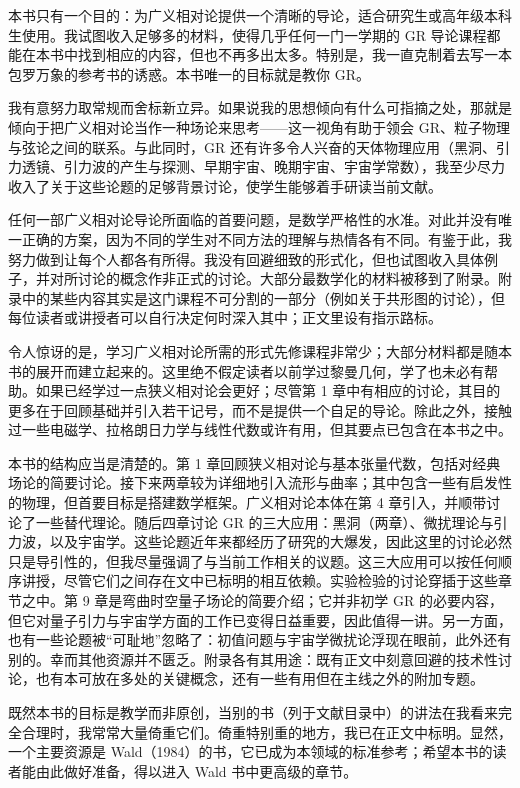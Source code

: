 本书只有一个目的：为广义相对论提供一个清晰的导论，适合研究生或高年级本科生使用。我试图收入足够多的材料，使得几乎任何一门一学期的 GR 导论课程都能在本书中找到相应的内容，但也不再多出太多。特别是，我一直克制着去写一本包罗万象的参考书的诱惑。本书唯一的目标就是教你 GR。

我有意努力取常规而舍标新立异。如果说我的思想倾向有什么可指摘之处，那就是倾向于把广义相对论当作一种场论来思考——这一视角有助于领会 GR、粒子物理与弦论之间的联系。与此同时，GR 还有许多令人兴奋的天体物理应用（黑洞、引力透镜、引力波的产生与探测、早期宇宙、晚期宇宙、宇宙学常数），我至少尽力收入了关于这些论题的足够背景讨论，使学生能够着手研读当前文献。

任何一部广义相对论导论所面临的首要问题，是数学严格性的水准。对此并没有唯一正确的方案，因为不同的学生对不同方法的理解与热情各有不同。有鉴于此，我努力做到让每个人都各有所得。我没有回避细致的形式化，但也试图收入具体例子，并对所讨论的概念作非正式的讨论。大部分最数学化的材料被移到了附录。附录中的某些内容其实是这门课程不可分割的一部分（例如关于共形图的讨论），但每位读者或讲授者可以自行决定何时深入其中；正文里设有指示路标。

令人惊讶的是，学习广义相对论所需的形式先修课程非常少；大部分材料都是随本书的展开而建立起来的。这里绝不假定读者以前学过黎曼几何，学了也未必有帮助。如果已经学过一点狭义相对论会更好；尽管第 1 章中有相应的讨论，其目的更多在于回顾基础并引入若干记号，而不是提供一个自足的导论。除此之外，接触过一些电磁学、拉格朗日力学与线性代数或许有用，但其要点已包含在本书之中。

本书的结构应当是清楚的。第 1 章回顾狭义相对论与基本张量代数，包括对经典场论的简要讨论。接下来两章较为详细地引入流形与曲率；其中包含一些有启发性的物理，但首要目标是搭建数学框架。广义相对论本体在第 4 章引入，并顺带讨论了一些替代理论。随后四章讨论 GR 的三大应用：黑洞（两章）、微扰理论与引力波，以及宇宙学。这些论题近年来都经历了研究的大爆发，因此这里的讨论必然只是导引性的，但我尽量强调了与当前工作相关的议题。这三大应用可以按任何顺序讲授，尽管它们之间存在文中已标明的相互依赖。实验检验的讨论穿插于这些章节之中。第 9 章是弯曲时空量子场论的简要介绍；它并非初学 GR 的必要内容，但它对量子引力与宇宙学方面的工作已变得日益重要，因此值得一讲。另一方面，也有一些论题被“可耻地”忽略了：初值问题与宇宙学微扰论浮现在眼前，此外还有别的。幸而其他资源并不匮乏。附录各有其用途：既有正文中刻意回避的技术性讨论，也有本可放在多处的关键概念，还有一些有用但在主线之外的附加专题。

既然本书的目标是教学而非原创，当别的书（列于文献目录中）的讲法在我看来完全合理时，我常常大量倚重它们。倚重特别重的地方，我已在正文中标明。显然，一个主要资源是 Wald（1984）的书，它已成为本领域的标准参考；希望本书的读者能由此做好准备，得以进入 Wald 书中更高级的章节。

